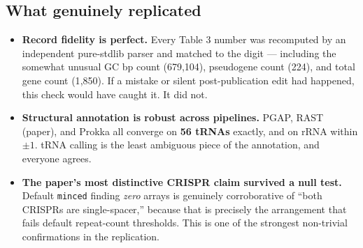 \documentclass[11pt]{article}
\begin{document}
\subsection{What genuinely replicated}
\begin{itemize}[leftmargin=*, itemsep=2pt]
  \item \textbf{Record fidelity is perfect.} Every Table 3 number was recomputed by an independent
  pure-stdlib parser and matched to the digit --- including the somewhat unusual GC bp count
  (679{,}104), pseudogene count (224), and total gene count (1{,}850). If a mistake or silent
  post-publication edit had happened, this check would have caught it. It did not.
  \item \textbf{Structural annotation is robust across pipelines.} PGAP, RAST (paper), and Prokka
  all converge on \textbf{56 tRNAs} exactly, and on rRNA within $\pm 1$. tRNA calling is the least
  ambiguous piece of the annotation, and everyone agrees.
  \item \textbf{The paper's most distinctive CRISPR claim survived a null test.} Default
  \texttt{minced} finding \emph{zero} arrays is genuinely corroborative of ``both CRISPRs are
  single-spacer,'' because that is precisely the arrangement that fails default repeat-count
  thresholds. This is one of the strongest non-trivial confirmations in the replication.
\end{itemize}
\end{document}
